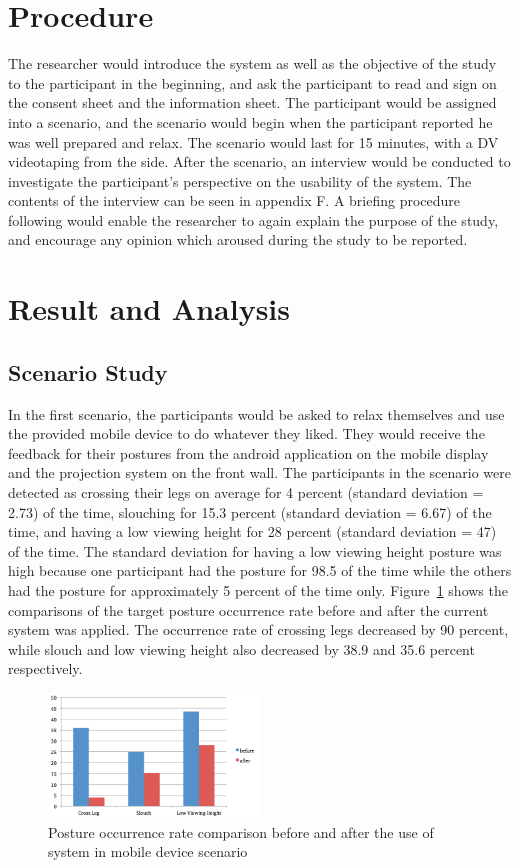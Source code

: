 \section{Procedure}
The researcher would introduce the system as well as the objective of the study to the participant in the beginning, and ask the participant to read and sign on the consent sheet and the information sheet. The participant would be assigned into a scenario, and the scenario would begin when the participant reported he was well prepared and relax. The scenario would last for 15 minutes, with a DV videotaping from the side. After the scenario, an interview would be conducted to investigate the participant’s perspective on the usability of the system. The contents of the interview can be seen in appendix F. A briefing procedure following would enable the researcher to again explain the purpose of the study, and encourage any opinion which aroused during the study to be reported.

\section{Result and Analysis}
\subsection{Scenario Study}
In the first scenario, the participants would be asked to relax themselves and use the provided mobile device to do whatever they liked. They would receive the feedback for their postures from the android application on the mobile display and the projection system on the front wall. The participants in the scenario were detected as crossing their legs on average for 4 percent (standard deviation = 2.73) of the time, slouching for 15.3 percent (standard deviation = 6.67) of the time, and having a low viewing height for 28 percent (standard deviation = 47) of the time. The standard deviation for having a low viewing height posture was high because one participant had the posture for 98.5 of the time while the others had the posture for approximately 5 percent of the time only. Figure~\ref{fig:scenario_mobile} shows the comparisons of the target posture occurrence rate before and after the current system was applied. The occurrence rate of crossing legs decreased by 90 percent, while slouch and low viewing height also decreased by 38.9 and 35.6 percent respectively.

\begin{figure}[h]
\centering
  \includegraphics[width=0.5\textwidth]{figs/scenario1}
\caption{Posture occurrence rate comparison before and after the use of system in mobile device scenario}
\label{fig:scenario_mobile}
\end{figure}

